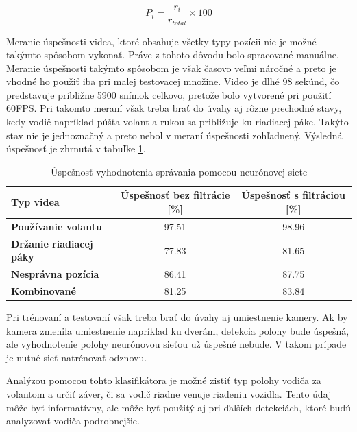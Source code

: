 \documentclass[slovak,master,dept460,male,cpp,cpdeclaration]{diploma}
\begin{document}
\begin{equation}
P_i= \frac{r_i}{r_{total}} \times 100
\label{eq:prediction}
\end{equation}

Meranie úspešnosti videa, ktoré obsahuje všetky typy pozícii nie je možné takýmto spôsobom vykonať. Práve z tohoto dôvodu bolo spracované manuálne. Meranie úspešnosti takýmto spôsobom je však časovo veľmi náročné a preto je vhodné ho použiť iba pri malej testovacej množine. Video je dlhé 98 sekúnd, čo predstavuje približne 5900 snímok celkovo, pretože bolo vytvorené pri použití 60FPS. Pri takomto meraní však treba brať do úvahy aj rôzne prechodné stavy, kedy vodič napríklad púšťa volant a rukou sa približuje ku riadiacej páke. Takýto stav nie je jednoznačný a preto nebol v meraní úspešnosti zohľadnený. Výsledná úspešnosť je zhrnutá v tabuľke \ref{tab:neuronka}.

\begin{table}[H]
\begin{tabular}{|l|c|c|}
\hline
\textbf{Typ videa}        & \textbf{Úspešnosť bez filtrácie [\%]}  & \textbf{Úspešnosť s filtráciou [\%]} \\ \hline
\textbf{Používanie volantu}      & 97.51     &  98.96       \\ \hline
\textbf{Držanie riadiacej páky}      & 77.83     &  81.65    \\ \hline
\textbf{Nesprávna pozícia}      & 86.41     &  87.75   \\ \hline
\textbf{Kombinované}      & 81.25     &  83.84   \\ \hline
\end{tabular}

	\caption{Úspešnosť vyhodnotenia správania pomocou neurónovej siete}
	\label{tab:neuronka}
\end{table}

Pri trénovaní a testovaní však treba brať do úvahy aj umiestnenie kamery. Ak by kamera zmenila umiestnenie napríklad ku dverám, detekcia polohy bude úspešná, ale  vyhodnotenie polohy neurónovou sieťou už úspešné nebude. V takom prípade je nutné sieť natrénovať odznovu.\par 
Analýzou pomocou tohto klasifikátora je možné zistiť typ polohy vodiča za volantom a určiť záver, či sa vodič riadne venuje riadeniu vozidla. Tento údaj môže byť informatívny, ale môže byť použitý aj pri  ďalších detekciách, ktoré budú analyzovať vodiča podrobnejšie.
 
\newpage
\end{document}
